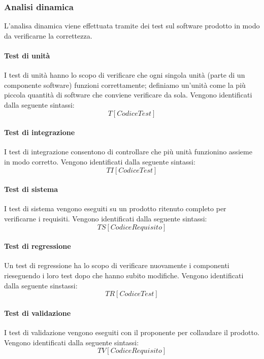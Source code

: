	\subsubsection{Analisi dinamica}
	L'analisa dinamica viene effettuata tramite dei test sul software prodotto in modo da verificarne la correttezza.
	\paragraph{Test di unità}
		I test di unità hanno lo scopo di verificare che ogni singola unità (parte di un componente software) funzioni correttamente; definiamo un'unità come la più piccola quantità di software che conviene verificare da sola. Vengono identificati dalla seguente sintassi:
		\begin{equation}
			T[Codice Test]
		\end{equation}
	\paragraph{Test di integrazione}
		I test di integrazione consentono di controllare che più unità funzionino assieme in modo corretto. Vengono identificati dalla seguente sintassi:
		\begin{equation}
			TI[Codice Test]
		\end{equation}
	\paragraph{Test di sistema}
		I test di sistema vengono eseguiti su un prodotto ritenuto completo per verificarne i requisiti. Vengono identificati dalla seguente sintassi:
		\begin{equation}
			TS[Codice Requisito]
		\end{equation}
	\paragraph{Test di regressione}
		Un test di regressione ha lo scopo di verificare nuovamente i componenti rieseguendo i loro test dopo che hanno subito modifiche. Vengono identificati dalla seguente sinstassi:
		\begin{equation}
			TR[Codice Test]
		\end{equation}
	\paragraph{Test di validazione}
		I test di validazione vengono eseguiti con il proponente per collaudare il prodotto. Vengono identificati dalla seguente sintassi:
		\begin{equation}
			TV[Codice Requisito]
		\end{equation}
